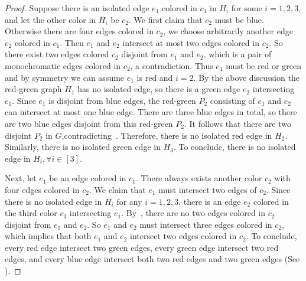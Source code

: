 \documentclass[a4paper]{article}
\begin{document}
\begin{proof}
Suppose there is an isolated edge $e_1$ colored in $c_1$ in $H_i$ for some $i=1,2,3$, and let the other color in $H_i$ be $c_2$. We first claim that $c_2$ must be blue. Otherwise there are four edges colored in $c_2$, we choose arbitrarily another edge $e_2$ colored in $c_1$. Then $e_1$ and $e_2$ intersect at most two edges colored in $c_2$. So there exist two edges colored $c_2$ disjoint from $e_1$ and $e_2$,  which is a pair of monochromatic edges colored in $c_2$, a contradiction. Thus $e_1$ must be red or green and by symmetry we can assume $e_1$ is red and $i=2$.
By the above discussion the red-green graph $H_1$ has no isolated edge, so there is a green edge $e_2$ intersecting $e_1$. Since $e_1$ is disjoint from blue edges, the red-green $P_2$ consisting of $e_1$ and $e_2$ can intersect at most one blue edge. There are three blue edges in total, so there are two blue edges disjoint from this red-green $P_2$. It follows that there are two disjoint $P_2$ in $G$,contradicting~. Therefore, there is no isolated red edge in $H_2$. Similarly, there is no isolated green edge in $H_3$. To conclude, there is no isolated edge in $H_i,\forall i \in [3]$.

Next, let $e_1$ be an edge colored in $c_1$. There always exists another color $c_2$ with four edges colored in $c_2$. We claim that $e_1$ must intersect two edges of $c_2$. Since there is no isolated edge in $H_i$ for any $i=1,2,3$, there is an edge $e_2$ colored in the third color $c_3$ intersecting $e_1$. By~, there are no two edges colored in $c_2$ disjoint from $e_1$ and $e_2$. So $e_1$ and $e_2$ must intersect three edges colored in $c_2$, which implies that both $e_1$ and $e_2$ intersect two edges colored in $c_2$. To conclude, every red edge intersect two green edges, every green edge intersect two red edges, and every blue edge intersect both two red edges and two green edges (See ).


\end{proof}
\end{document}
